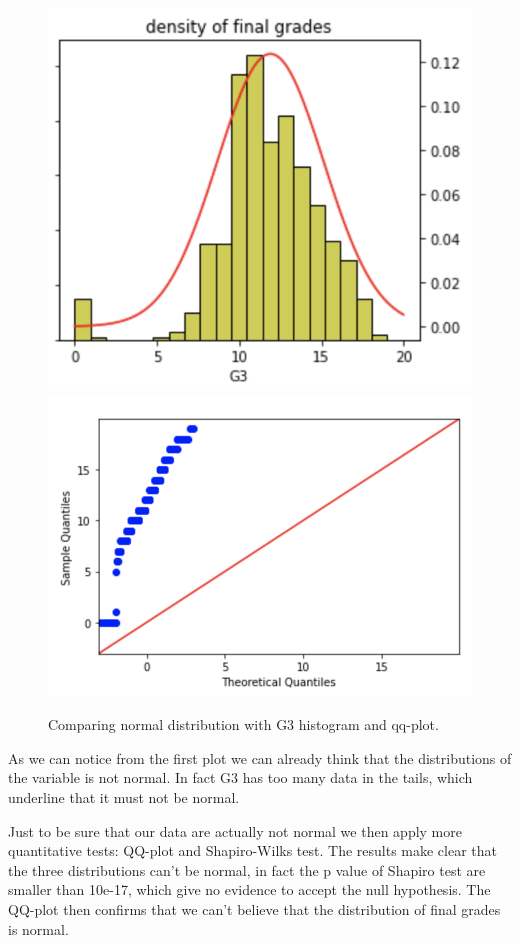 \documentclass[a4paper, 11pt]{report}
\theoremstyle{definition}
\numberwithin{equation}{section}		%
\numberwithin{table}{section}				%
\begin{document}
\begin{figure}[h]
\centering
\includegraphics[scale=0.5]{G3_distribution.png}
\includegraphics[scale=0.5]{qq-plot_G3.png}
\caption{Comparing normal distribution with G3 histogram and qq-plot.}
\end{figure}

As we can notice from the first plot we can already think that the distributions of the variable is not normal. In fact G3 has too many data in the tails, which underline that it must not be normal.

Just to be sure that our data are actually not normal we then apply more quantitative tests: QQ-plot and Shapiro-Wilks test.
The results make clear that the three distributions can't be normal, in fact the p value of Shapiro test are smaller than 10e-17, which give no evidence to accept the null hypothesis. The QQ-plot then confirms that we can't believe that the distribution of final grades is normal.
\end{document}
